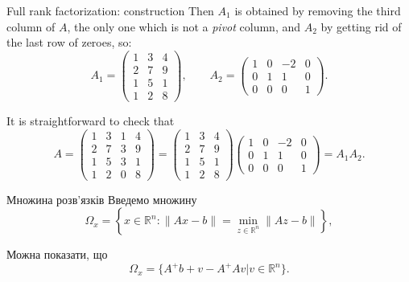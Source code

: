 \begin{mframe}{Full rank factorization: construction}
    Then $A_1$ is obtained by removing the third column of $A$, the only one
    which is not a \textit{pivot} column, and $A_2$ by getting rid of the last
    row of zeroes, so:
    \begin{equation*}
        A_1 = \begin{pmatrix}
            1 & 3 & 4 \\
            2 & 7 & 9 \\
            1 & 5 & 1 \\
            1 & 2 & 8 
        \end{pmatrix},
        \qquad 
        A_2 = \begin{pmatrix}
            1 & 0 & -2 & 0 \\
            0 & 1 & 1 & 0 \\
            0 & 0 & 0 & 1
        \end{pmatrix}.
    \end{equation*}
    
    It is straightforward to check that
    \begin{equation*}
        A = \begin{pmatrix}
            1 & 3 & 1 & 4 \\
            2 & 7 & 3 & 9 \\
            1 & 5 & 3 & 1 \\
            1 & 2 & 0 & 8
        \end{pmatrix}
        = \begin{pmatrix}
            1 & 3 & 4 \\
            2 & 7 & 9 \\
            1 & 5 & 1 \\
            1 & 2 & 8 
        \end{pmatrix}
        \begin{pmatrix}
            1 & 0 & -2 & 0 \\
            0 & 1 & 1 & 0 \\
            0 & 0 & 0 & 1
        \end{pmatrix} = A_1 A_2.
    \end{equation*}
\end{mframe}

\begin{mframe}{Множина розв'язків}
    Введемо множину
    \begin{equation}
        \label{eq:1.2}
        \Omega_x = \left\{ x \in \mathbb{R}^n :
        \|A x - b\| = \min_{z \in \mathbb{R}^n} \|A z - b\| \right\},
    \end{equation}

    Можна показати, що
    \begin{equation}
        \label{eq:1.4a}
        \Omega_x = \Big\{ A^+ b + v - A^+ A v \Big| v \in \mathbb{R}^n \Big\}.
    \end{equation}
\end{mframe}

